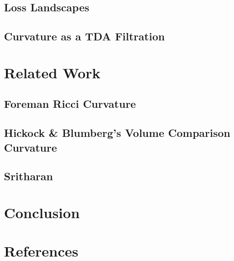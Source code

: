 \documentclass[
  letterpaper,
  DIV=11,
  numbers=noendperiod]{scrartcl}
\theoremstyle{plain}
\theoremstyle{definition}
\theoremstyle{plain}
\theoremstyle{plain}
\theoremstyle{definition}
\theoremstyle{remark}
\begin{document}
\subsection{Loss Landscapes}\label{loss-landscapes}

\subsection{Curvature as a TDA
Filtration}\label{curvature-as-a-tda-filtration}

\section{Related Work}\label{related-work}

\subsection{Foreman Ricci Curvature}\label{foreman-ricci-curvature}

\subsection{Hickock \& Blumberg's Volume Comparison
Curvature}\label{hickock-blumbergs-volume-comparison-curvature}

\subsection{Sritharan}\label{sritharan}

\section{Conclusion}\label{conclusion}

\section*{References}\label{references}
\end{document}
